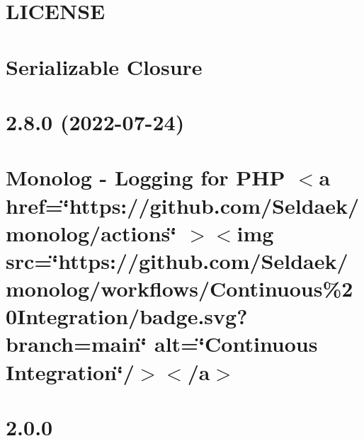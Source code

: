 \documentclass[twoside]{book}
\newcommand{\+}{\discretionary{\mbox{\scriptsize$\hookleftarrow$}}{}{}}
\begin{document}
\chapter{LICENSE}
\label{md__c__workspace__proyecto__p_h_p_project_vendor_laravel_serializable_closure__l_i_c_e_n_s_e}

\chapter{Serializable Closure}
\label{md__c__workspace__proyecto__p_h_p_project_vendor_laravel_serializable_closure__r_e_a_d_m_e}

\chapter{2.8.0 (2022-\/07-\/24)}
\label{md__c__workspace__proyecto__p_h_p_project_vendor_monolog_monolog__c_h_a_n_g_e_l_o_g}

\chapter{Monolog -\/ Logging for PHP \texorpdfstring{$<$}{<}a href=\char`\"{}https\+://github.\+com/\+Seldaek/monolog/actions\char`\"{} \texorpdfstring{$>$}{>}\texorpdfstring{$<$}{<}img src=\char`\"{}https\+://github.\+com/\+Seldaek/monolog/workflows/\+Continuous\%20\+Integration/badge.\+svg?branch=main\char`\"{} alt=\char`\"{}\+Continuous Integration\char`\"{}/\texorpdfstring{$>$}{>}\texorpdfstring{$<$}{<}/a\texorpdfstring{$>$}{>}}
\label{md__c__workspace__proyecto__p_h_p_project_vendor_monolog_monolog__r_e_a_d_m_e}

\chapter{2.0.0}
\label{md__c__workspace__proyecto__p_h_p_project_vendor_monolog_monolog__u_p_g_r_a_d_e}

\end{document}
